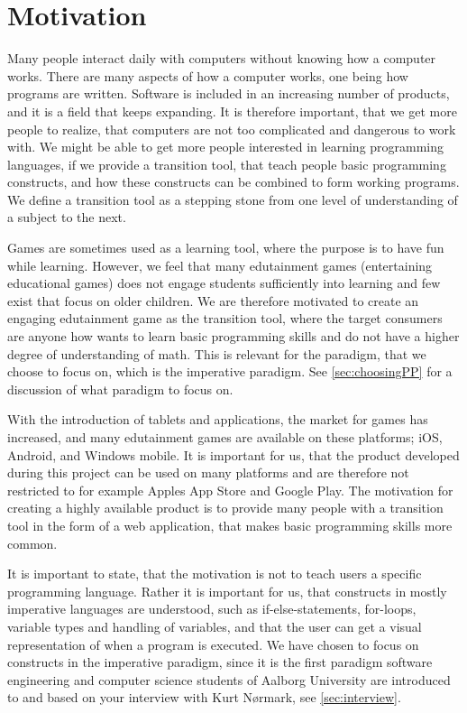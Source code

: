 \section{Motivation}
\label{sec:motivation}

Many people interact daily with computers without knowing how a computer works.
There are many aspects of how a computer works, one being how programs are written.
Software is included in an increasing number of products, and it is a field that keeps expanding.\cite{idaArtikelMangel}
It is therefore important, that we get more people to realize, that computers are not too complicated and dangerous to work with.
We might be able to get more people interested in learning programming languages, if we provide a transition tool, that teach people basic programming constructs, and how these constructs can be combined to form working programs.
We define a transition tool as a stepping stone from one level of understanding of a subject to the next.\newline

Games are sometimes used as a learning tool, where the purpose is to have fun while learning.
However, we feel that many edutainment games (entertaining educational games) does not engage students sufficiently into learning and few exist that focus on older children. 
We are therefore motivated to create an engaging edutainment game as the transition tool, where the target consumers are anyone how wants to learn basic programming skills and do not have a higher degree of understanding of math. This is relevant for the paradigm, that we choose to focus on, which is the imperative paradigm. See \autoref{sec:choosingPP} for a discussion of what paradigm to focus on.\newline

With the introduction of tablets and applications, the market for games has increased, and many edutainment games are available on these platforms; iOS, Android, and Windows mobile.
It is important for us, that the product developed during this project can be used on many platforms and are therefore not restricted to for example Apples App Store and Google Play.
The motivation for creating a highly available product is to provide many people with a transition tool in the form of a web application, that makes basic programming skills more common.\newline

It is important to state, that the motivation is not to teach users a specific programming language.
Rather it is important for us, that constructs in mostly imperative languages are understood, such as if-else-statements, for-loops, variable types and handling of variables, and that the user can get a visual representation of when a program is executed. We have chosen to focus on constructs in the imperative paradigm, since it is the first paradigm software engineering and computer science students of Aalborg University are introduced to and based on your interview with Kurt N{\o}rmark, see \autoref{sec:interview}.\newline

